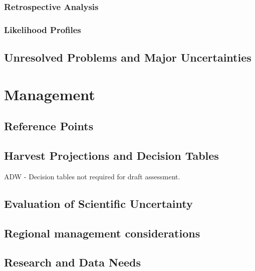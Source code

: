 \documentclass[
]{scrartcl}
\begin{document}
\subsubsection{Retrospective Analysis}\label{retrospective-analysis}

\subsubsection{Likelihood Profiles}\label{likelihood-profiles}

\subsection{Unresolved Problems and Major
Uncertainties}\label{unresolved-problems-and-major-uncertainties}

\newpage{}

\section{Management}\label{management}

\subsection{Reference Points}\label{reference-points}

\subsection{Harvest Projections and Decision
Tables}\label{harvest-projections-and-decision-tables}

ADW - Decision tables not required for draft assessment.

\subsection{Evaluation of Scientific
Uncertainty}\label{evaluation-of-scientific-uncertainty}

\subsection{Regional management
considerations}\label{regional-management-considerations}

\subsection{Research and Data Needs}\label{research-and-data-needs}
\end{document}
